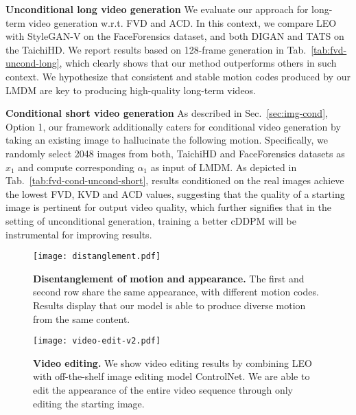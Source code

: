 {\textbf{Unconditional long video generation} 
We evaluate our approach for long-term video generation w.r.t. FVD and ACD. In this context, we compare LEO with StyleGAN-V on the FaceForensics dataset, and both DIGAN and TATS on the TaichiHD. We report results based on 128-frame generation in Tab.~\ref{tab:fvd-uncond-long}, which clearly shows that our method outperforms others in such context. We hypothesize that consistent and stable motion codes produced by our LMDM are key to producing high-quality long-term videos.


\textbf{Conditional short video generation}
As described in Sec.~\ref{sec:img-cond}, Option 1, our framework additionally caters for conditional video generation by taking an existing image to hallucinate the following motion. Specifically, we randomly select 2048 images from both, TaichiHD and FaceForensics datasets as $x_1$ and compute corresponding $\alpha_1$ as input of LMDM. As depicted in Tab.~\ref{tab:fvd-cond-uncond-short}, results conditioned on the real images achieve the lowest FVD, KVD and ACD values, suggesting that the quality of a starting image is pertinent for output video quality, which further signifies that in the setting of unconditional generation, training a better cDDPM will be instrumental for improving results.

\begin{figure*}[t!]
\centering
\texttt{[image: distanglement.pdf]}  
\caption{\textbf{Disentanglement of motion and appearance.} The first and second row share the same appearance, with different motion codes. Results display that our model is able to produce diverse motion from the same content.}%
\label{fig:disentanglement}
\end{figure*}

\begin{figure*}[t!]
\centering
\texttt{[image: video-edit-v2.pdf]}  
\caption{\textbf{Video editing.} We show video editing results by combining LEO with off-the-shelf image editing model ControlNet. We are able to edit the appearance of the entire video sequence through only editing the starting image.}
\label{fig:semantic-edit-taichi}
\end{figure*}

}
